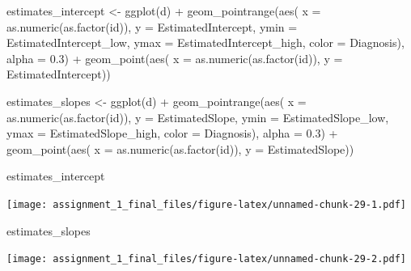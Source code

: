 \documentclass[
]{article}
\newenvironment{Shaded}{\begin{snugshade}}{\end{snugshade}}
\newcommand{\AttributeTok}[1]{\textcolor[rgb]{0.77,0.63,0.00}{#1}}
\newcommand{\FloatTok}[1]{\textcolor[rgb]{0.00,0.00,0.81}{#1}}
\newcommand{\FunctionTok}[1]{\textcolor[rgb]{0.00,0.00,0.00}{#1}}
\newcommand{\NormalTok}[1]{#1}
\newcommand{\OtherTok}[1]{\textcolor[rgb]{0.56,0.35,0.01}{#1}}
\newcommand{\SpecialCharTok}[1]{\textcolor[rgb]{0.00,0.00,0.00}{#1}}
\begin{document}
\begin{Shaded}
\begin{Highlighting}[]
\NormalTok{estimates\_intercept }\OtherTok{\textless{}{-}} \FunctionTok{ggplot}\NormalTok{(d) }\SpecialCharTok{+}
  \FunctionTok{geom\_pointrange}\NormalTok{(}\FunctionTok{aes}\NormalTok{( }\AttributeTok{x =} \FunctionTok{as.numeric}\NormalTok{(}\FunctionTok{as.factor}\NormalTok{(id)), }\AttributeTok{y =}\NormalTok{ EstimatedIntercept,}
                       \AttributeTok{ymin =}\NormalTok{ EstimatedIntercept\_low, }\AttributeTok{ymax =}\NormalTok{ EstimatedIntercept\_high,}
                       \AttributeTok{color =}\NormalTok{ Diagnosis), }\AttributeTok{alpha =} \FloatTok{0.3}\NormalTok{) }\SpecialCharTok{+}
  \FunctionTok{geom\_point}\NormalTok{(}\FunctionTok{aes}\NormalTok{( }\AttributeTok{x =} \FunctionTok{as.numeric}\NormalTok{(}\FunctionTok{as.factor}\NormalTok{(id)), }\AttributeTok{y =}\NormalTok{ EstimatedIntercept))}

\NormalTok{estimates\_slopes }\OtherTok{\textless{}{-}} \FunctionTok{ggplot}\NormalTok{(d) }\SpecialCharTok{+}
  \FunctionTok{geom\_pointrange}\NormalTok{(}\FunctionTok{aes}\NormalTok{( }\AttributeTok{x =} \FunctionTok{as.numeric}\NormalTok{(}\FunctionTok{as.factor}\NormalTok{(id)), }\AttributeTok{y =}\NormalTok{ EstimatedSlope,}
                       \AttributeTok{ymin =}\NormalTok{ EstimatedSlope\_low, }\AttributeTok{ymax =}\NormalTok{ EstimatedSlope\_high,}
                       \AttributeTok{color =}\NormalTok{ Diagnosis), }\AttributeTok{alpha =} \FloatTok{0.3}\NormalTok{) }\SpecialCharTok{+}
  \FunctionTok{geom\_point}\NormalTok{(}\FunctionTok{aes}\NormalTok{( }\AttributeTok{x =} \FunctionTok{as.numeric}\NormalTok{(}\FunctionTok{as.factor}\NormalTok{(id)), }\AttributeTok{y =}\NormalTok{ EstimatedSlope))}

\NormalTok{estimates\_intercept}
\end{Highlighting}
\end{Shaded}

\texttt{[image: assignment\_1\_final\_files/figure-latex/unnamed-chunk-29-1.pdf]}

\begin{Shaded}
\begin{Highlighting}[]
\NormalTok{estimates\_slopes}
\end{Highlighting}
\end{Shaded}

\texttt{[image: assignment\_1\_final\_files/figure-latex/unnamed-chunk-29-2.pdf]}
\end{document}
